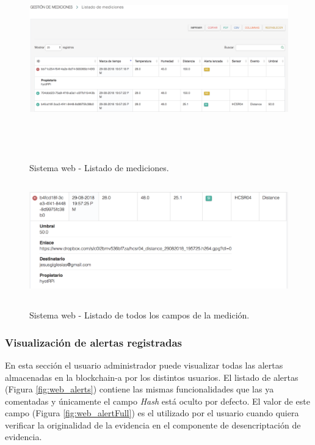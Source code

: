\documentclass[12pt,a4paper, twoside]{report}
\begin{document}
		\begin{figure}[!ht]   
			\caption{Sistema web - Listado de mediciones.} 
			\begin{center}
	 			\includegraphics[width=17cm, height=8cm]{Images/userGuide/web/measurements} \\
	 			\label{fig:web_measurements} 
			\end{center}  	
		\end{figure}
		
		\begin{figure}[!ht]   
			\caption{Sistema web - Listado de todos los campos de la medición.} 
			\begin{center}
	 			\includegraphics[width=17cm, height=5cm]{Images/userGuide/web/measurementFull} \\
	 			\label{fig:web_measurementFull} 
			\end{center}  	
		\end{figure}
	
	\subsubsection{Visualización de alertas registradas}
			
	En esta sección el usuario administrador puede visualizar todas las alertas almacenadas en la \gls{blockchain-a} por los distintos usuarios. El listado de alertas (Figura \ref{fig:web_alerts}) contiene las mismas funcionalidades que las ya comentadas y únicamente el campo \textit{Hash} está oculto por defecto. El valor de este campo (Figura \ref{fig:web_alertFull}) es el utilizado por el usuario cuando quiera verificar la originalidad de la evidencia en el componente de desencriptación de evidencia. 
		
\end{document}
